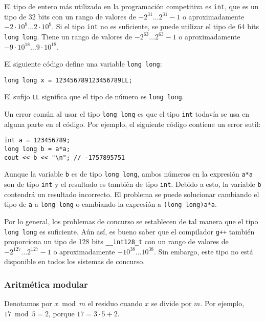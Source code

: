 El tipo de entero más utilizado en la programación competitiva
es \texttt{int}, que es un tipo de 32 bits con
un rango de valores de $-2^{31} \ldots 2^{31}-1$
o aproximadamente $-2 \cdot 10^9 \ldots 2 \cdot 10^9$.
Si el tipo \texttt{int} no es suficiente,
se puede utilizar el tipo de 64 bits \texttt{long long}.
Tiene un rango de valores de $-2^{63} \ldots 2^{63}-1$
o aproximadamente $-9 \cdot 10^{18} \ldots 9 \cdot 10^{18}$.

El siguiente código define una
variable \texttt{long long}:
\begin{lstlisting}
long long x = 123456789123456789LL;
\end{lstlisting}
El sufijo \texttt{LL} significa que el
tipo de número es \texttt{long long}.

Un error común al usar el tipo \texttt{long long}
es que el tipo \texttt{int} todavía se usa en alguna parte
en el código.
Por ejemplo, el siguiente código contiene
un error sutil:

\begin{lstlisting}
int a = 123456789;
long long b = a*a;
cout << b << "\n"; // -1757895751
\end{lstlisting}

Aunque la variable \texttt{b} es de tipo \texttt{long long},
ambos números en la expresión \texttt{a*a}
son de tipo \texttt{int} y el resultado es
también de tipo \texttt{int}.
Debido a esto, la variable \texttt{b} contendrá
un resultado incorrecto.
El problema se puede solucionar cambiando el tipo
de \texttt{a} a \texttt{long long} o
cambiando la expresión a \texttt{(long long)a*a}.


Por lo general, los problemas de concurso se establecen de tal manera que
el tipo \texttt{long long} es suficiente.
Aún así, es bueno saber que
el compilador \texttt{g++} también proporciona
un tipo de 128 bits \texttt{\_\_int128\_t}
con un rango de valores de
$-2^{127} \ldots 2^{127}-1$ o aproximadamente $-10^{38} \ldots 10^{38}$.
Sin embargo, este tipo no está disponible en todos los sistemas de concurso.

\subsubsection{Aritmética modular}


Denotamos por $x \bmod m$ el residuo
cuando $x$ se divide por $m$.
Por ejemplo, $17 \bmod 5 = 2$,
porque $17 = 3 \cdot 5 + 2$.

